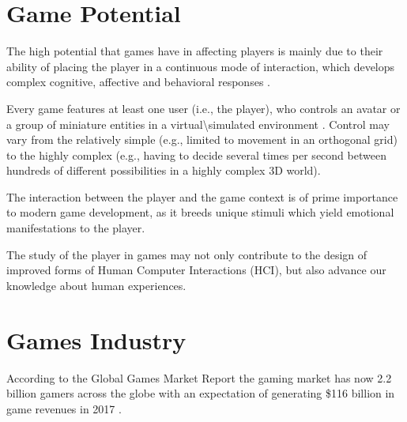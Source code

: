 \section{Game Potential}
The high potential that games have in affecting players is mainly due to their ability of placing the player in a continuous mode of interaction, which develops complex cognitive, affective and behavioral responses \citep{YannakakisPlayerModeling2013}.

Every game features at least one user (i.e., the player), who controls an avatar or a group of miniature entities in a virtual\textbackslash{}simulated environment \citep{CallejaIngameimmersionincorporation2011}.
Control may vary from the relatively simple (e.g., limited to movement in an orthogonal grid) to the highly complex (e.g., having to decide several times per second between hundreds of different possibilities in a highly complex 3D world).

The interaction between the player and the game context is of prime importance to modern game development, as it breeds unique stimuli which yield emotional manifestations to the player.

The study of the player in games may not only contribute to the design of improved forms of Human Computer Interactions (HCI), but also advance our knowledge about human experiences.

\section{Games Industry}
According to the Global Games Market Report \citep{NewGamingBoom} the gaming market has now 2.2 billion gamers across the globe with an expectation of generating \$116 billion in game revenues in 2017 \citep{GlobalGamesMarket}.

